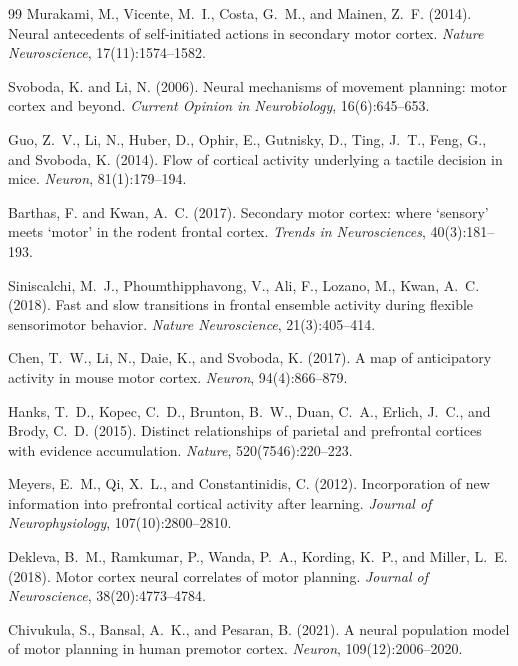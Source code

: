 \documentclass[10pt,onecolumn]{article}
\begin{document}
\begin{thebibliography}{99}
Murakami, M., Vicente, M.~I., Costa, G.~M., and Mainen, Z.~F. (2014).
\newblock Neural antecedents of self-initiated actions in secondary motor cortex.
\newblock \textit{Nature Neuroscience}, 17(11):1574--1582.

Svoboda, K. and Li, N. (2006).
\newblock Neural mechanisms of movement planning: motor cortex and beyond.
\newblock \textit{Current Opinion in Neurobiology}, 16(6):645--653.

Guo, Z.~V., Li, N., Huber, D., Ophir, E., Gutnisky, D., Ting, J.~T., Feng, G., and Svoboda, K. (2014).
\newblock Flow of cortical activity underlying a tactile decision in mice.
\newblock \textit{Neuron}, 81(1):179--194.

Barthas, F. and Kwan, A.~C. (2017).
\newblock Secondary motor cortex: where ‘sensory’ meets ‘motor’ in the rodent frontal cortex.
\newblock \textit{Trends in Neurosciences}, 40(3):181--193.

Siniscalchi, M.~J., Phoumthipphavong, V., Ali, F., Lozano, M., Kwan, A.~C. (2018).
\newblock Fast and slow transitions in frontal ensemble activity during flexible sensorimotor behavior.
\newblock \textit{Nature Neuroscience}, 21(3):405--414.

Chen, T.~W., Li, N., Daie, K., and Svoboda, K. (2017).
\newblock A map of anticipatory activity in mouse motor cortex.
\newblock \textit{Neuron}, 94(4):866--879.

Hanks, T.~D., Kopec, C.~D., Brunton, B.~W., Duan, C.~A., Erlich, J.~C., and Brody, C.~D. (2015).
\newblock Distinct relationships of parietal and prefrontal cortices with evidence accumulation.
\newblock \textit{Nature}, 520(7546):220--223.

Meyers, E.~M., Qi, X.~L., and Constantinidis, C. (2012).
\newblock Incorporation of new information into prefrontal cortical activity after learning.
\newblock \textit{Journal of Neurophysiology}, 107(10):2800--2810.

Dekleva, B.~M., Ramkumar, P., Wanda, P.~A., Kording, K.~P., and Miller, L.~E. (2018).
\newblock Motor cortex neural correlates of motor planning.
\newblock \textit{Journal of Neuroscience}, 38(20):4773--4784.

Chivukula, S., Bansal, A.~K., and Pesaran, B. (2021).
\newblock A neural population model of motor planning in human premotor cortex.
\newblock \textit{Neuron}, 109(12):2006--2020.


\end{thebibliography}
\end{document}
